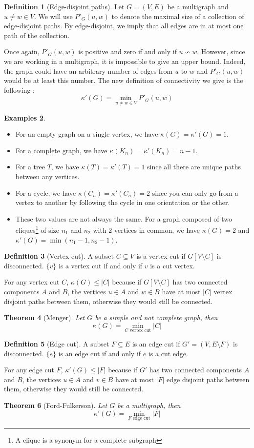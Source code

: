 \documentclass{tufte-handout}
\newtheorem{thm}{Theorem}
\theoremstyle{definition}
\newtheorem{defn}[thm]{Definition}
\newtheorem{exmps}[thm]{Examples}
\theoremstyle{remark}
\begin{document}
\begin{defn}[Edge-disjoint paths]
	Let $G=(V,E)$ be a multigraph and $u \neq w \in V$. We will use $P'_G(u,w)$ to denote the maximal size of a collection of edge-disjoint paths. By edge-disjoint, we imply that all edges are in at most one path of the collection.
\end{defn}
Once again, $P'_G(u,w)$ is positive and zero if and only if $u \not\sim w$. However, since we are working in a multigraph, it is impossible to give an upper bound. Indeed, the graph could have an arbitrary number of edges from $u$ to $w$ and $P'_G(u,w)$ would be at least this number. The new definition of connectivity we give is the following :
\[ \kappa'(G) = \min_{u \neq w \in V} P'_G(u,w) \]
\begin{exmps}
	\begin{itemize}
		\item For an empty graph on a single vertex, we have $\kappa(G) = \kappa'(G) = 1$.
		\item For a complete graph, we have $\kappa(K_n) = \kappa'(K_n) = n-1$.
		\item For a tree $T$, we have $\kappa(T) = \kappa'(T) = 1$ since all there are unique paths between any vertices.
		\item For a cycle, we have $\kappa(C_n) = \kappa'(C_n) = 2$ since you can only go from a vertex to another by following the cycle in one orientation or the other.
		\item These two values are not always the same. For a graph composed of two cliques\footnote{A clique is a synonym for a complete subgraph} of size $n_1$ and $n_2$ with 2 vertices in common, we have $\kappa(G) =2$ and $\kappa'(G) = \min(n_1-1, n_2-1)$.
	\end{itemize}
\end{exmps}
\begin{defn}[Vertex cut]
	A subset $C \subseteq V$ is a vertex cut if $G[V\setminus C]$ is disconnected. $\{v\}$ is a vertex cut if and only if $v$ is a cut vertex.
\end{defn}
For any vertex cut $C$, $\kappa(G) \leq |C|$ because if $G[V\setminus C]$ has two connected components $A$ and $B$, the vertices $u \in A$ and $w \in B$ have at most $|C|$ vertex disjoint paths between them, otherwise they would still be connected.
\begin{thm}[Menger]
	Let $G$ be a simple and not complete graph, then \[\kappa(G) = \min_{C \mbox{ vertex cut}} |C|\]
\end{thm}
\begin{defn}[Edge cut]
	A subset $F \subseteq E$ is an edge cut if $G' = (V, E\setminus F)$ is disconnected. $\{e\}$ is an edge cut if and only if $e$ is a cut edge.
\end{defn}
For any edge cut $F$, $\kappa'(G) \leq |F|$ because if $G'$ has two connected components $A$ and $B$, the vertices $u \in A$ and $v\in B$ have at most $|F|$ edge disjoint paths between them, otherwise they would still be connected.
\begin{thm}[Ford-Fulkerson]
	Let $G$ be a multigraph, then \[\kappa'(G) = \min_{F \mbox{ edge cut}} |F|\]
\end{thm}
\end{document}
